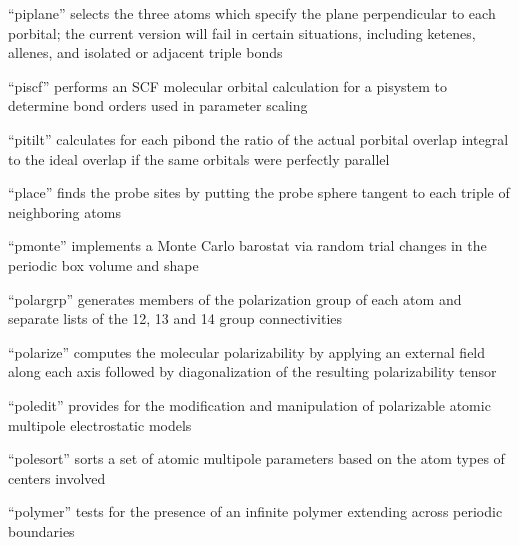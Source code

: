 \documentclass[letterpaper,11pt,english]{sphinxmanual}
\begin{document}

“piplane” selects the three atoms which specify the plane
perpendicular to each p\sphinxhyphen{}orbital; the current version will
fail in certain situations, including ketenes, allenes,
and isolated or adjacent triple bonds


“piscf” performs an SCF molecular orbital calculation for a
pisystem to determine bond orders used in parameter scaling


“pitilt” calculates for each pibond the ratio of the
actual p\sphinxhyphen{}orbital overlap integral to the ideal overlap
if the same orbitals were perfectly parallel


“place” finds the probe sites by putting the probe sphere
tangent to each triple of neighboring atoms


“pmonte” implements a Monte Carlo barostat via random trial
changes in the periodic box volume and shape


“polargrp” generates members of the polarization group of
each atom and separate lists of the 1\sphinxhyphen{}2, 1\sphinxhyphen{}3 and 1\sphinxhyphen{}4 group
connectivities


“polarize” computes the molecular polarizability by applying
an external field along each axis followed by diagonalization
of the resulting polarizability tensor


“poledit” provides for the modification and manipulation
of polarizable atomic multipole electrostatic models


“polesort” sorts a set of atomic multipole parameters based
on the atom types of centers involved


“polymer” tests for the presence of an infinite polymer
extending across periodic boundaries

\end{document}

